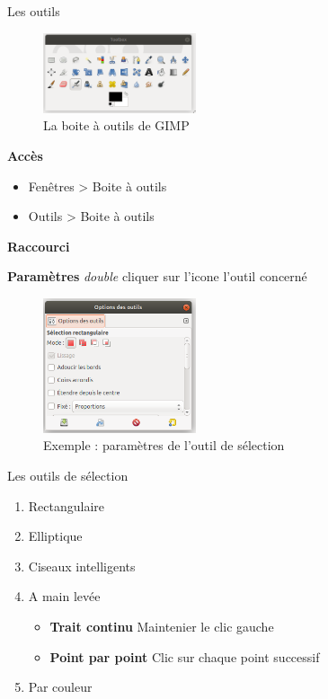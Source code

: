 \documentclass[10pt,svgnames,usenames,table]{beamer}
\begin{document}
\begin{frame}[allowframebreaks]{Les outils}
	
	\begin{figure}
        	\centering
        	\includegraphics[width=0.4\textwidth]{Images/gimp_toolbox.png}
        	\caption{La boite à outils de GIMP} 
    	\end{figure}
	
	\textbf{Accès}
	
	\begin{itemize}
		\item Fenêtres > Boite à outils
		\item Outils > Boite à outils
	\end{itemize}
	
	\vspace{0.2cm}
	\textbf{Raccourci} 
	
	\framebreak
	\textbf{Paramètres} \textit{double} cliquer sur l'icone l'outil concerné
	\begin{figure}
        	\centering
        	\includegraphics[width=0.4\textwidth]{Images/option_outil.png}
        	\caption{Exemple : paramètres de l'outil de sélection} 
    	\end{figure}

\end{frame}	

\begin{frame}{Les outils de sélection}
\begin{enumerate}
	\item Rectangulaire 	
	\item Elliptique 
	\item Ciseaux intelligents 
	\item A main levée 
	\begin{itemize}
		\item \textbf{Trait continu} Maintenier le clic gauche 
		\item \textbf{Point par point} Clic sur chaque point successif 
	\end{itemize} 
	\item Par couleur 
\end{enumerate}
\end{frame}
\end{document}
